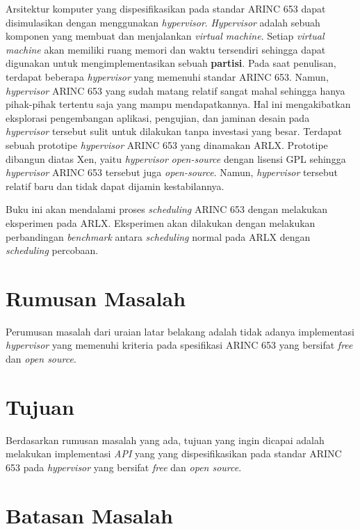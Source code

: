 Arsitektur komputer yang dispesifikasikan pada standar ARINC 653 dapat disimulasikan dengan menggunakan
\textit{hypervisor}. \textit{Hypervisor} adalah sebuah komponen yang membuat dan menjalankan \textit{virtual machine}.
Setiap \textit{virtual machine} akan memiliki ruang memori dan waktu tersendiri sehingga dapat digunakan untuk
mengimplementasikan sebuah \textbf{partisi}. Pada saat penulisan, terdapat beberapa \textit{hypervisor} yang memenuhi
standar ARINC 653.  Namun, \textit{hypervisor} ARINC 653 yang sudah matang relatif sangat mahal sehingga hanya
pihak-pihak tertentu saja yang mampu mendapatkannya. Hal ini mengakibatkan eksplorasi pengembangan aplikasi, pengujian,
dan jaminan desain pada \textit{hypervisor} tersebut sulit untuk dilakukan tanpa investasi yang besar. Terdapat sebuah
prototipe \textit{hypervisor} ARINC 653 yang dinamakan ARLX. Prototipe dibangun diatas Xen, yaitu \textit{hypervisor}
\textit{open-source} dengan lisensi GPL sehingga \textit{hypervisor} ARINC 653 tersebut juga \textit{open-source}.
Namun, \textit{hypervisor} tersebut relatif baru dan tidak dapat dijamin kestabilannya.

Buku ini akan mendalami proses \textit{scheduling} ARINC 653 dengan melakukan eksperimen pada ARLX. Eksperimen akan
dilakukan dengan melakukan perbandingan \textit{benchmark} antara \textit{scheduling} normal pada ARLX dengan
\textit{scheduling} percobaan.

\section{Rumusan Masalah}

Perumusan masalah dari uraian latar belakang adalah tidak adanya implementasi \textit{hypervisor} yang memenuhi kriteria
pada spesifikasi ARINC 653 yang bersifat \textit{free} dan \textit{open source}.

\section{Tujuan}

Berdasarkan rumusan masalah yang ada, tujuan yang ingin dicapai adalah melakukan implementasi \textit{API} yang
yang dispesifikasikan pada standar ARINC 653 pada \textit{hypervisor} yang bersifat \textit{free} dan \textit{open
source}.

\section{Batasan Masalah}
\label{section:batasan_masalah}


